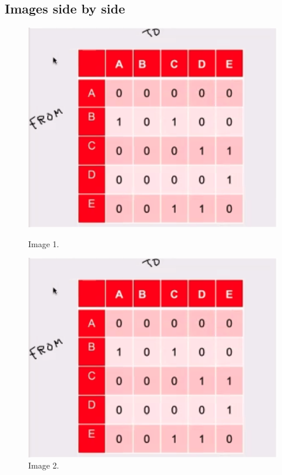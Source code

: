 \documentclass{article}
\begin{document}
    \subsection{Images side by side}
    \begin{figure}[htb]
        \begin{minipage}[t]{.5\textwidth}
            \centering
            \includegraphics[width=\textwidth]{fig/2.png}
            \caption{Image 1.}\label{fig:2}
        \end{minipage}
        \hfill
        \begin{minipage}[t]{.5\textwidth}
            \centering
            \includegraphics[width=\textwidth]{fig/2.png}
            \caption{Image 2.}\label{fig:3}
        \end{minipage}
        \hfill
    \end{figure}
\newpage
\end{document}
